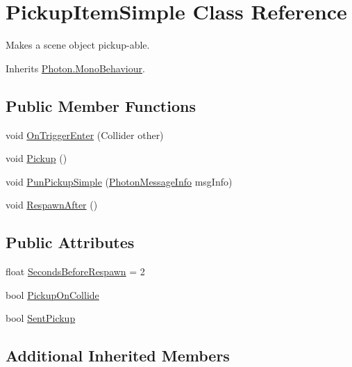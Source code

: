 \hypertarget{class_pickup_item_simple}{}\section{Pickup\+Item\+Simple Class Reference}
\label{class_pickup_item_simple}


Makes a scene object pickup-\/able.  




Inherits \hyperlink{class_photon_1_1_mono_behaviour}{Photon.\+Mono\+Behaviour}.

\subsection*{Public Member Functions}
\begin{DoxyCompactItemize}
\item 
void \hyperlink{class_pickup_item_simple_a881d6f64f61dec99bef0c5a473efb614}{On\+Trigger\+Enter} (Collider other)
\item 
void \hyperlink{class_pickup_item_simple_af3b7fe505e0a4e7ecd587bad9051a0b8}{Pickup} ()
\item 
void \hyperlink{class_pickup_item_simple_afab04ad30638068aaf6676f00aa8645c}{Pun\+Pickup\+Simple} (\hyperlink{class_photon_message_info}{Photon\+Message\+Info} msg\+Info)
\item 
void \hyperlink{class_pickup_item_simple_a54b4d90b309c5abbecbbf65f9d792bab}{Respawn\+After} ()
\end{DoxyCompactItemize}
\subsection*{Public Attributes}
\begin{DoxyCompactItemize}
\item 
float \hyperlink{class_pickup_item_simple_a0c8ca814aca61995c81df3cdc2bc7a3e}{Seconds\+Before\+Respawn} = 2
\item 
bool \hyperlink{class_pickup_item_simple_a733517ea66dbf144dc07a36b56aa8f83}{Pickup\+On\+Collide}
\item 
bool \hyperlink{class_pickup_item_simple_a3b0327f9a9c6e4ed9f79e492e2959759}{Sent\+Pickup}
\end{DoxyCompactItemize}
\subsection*{Additional Inherited Members}


